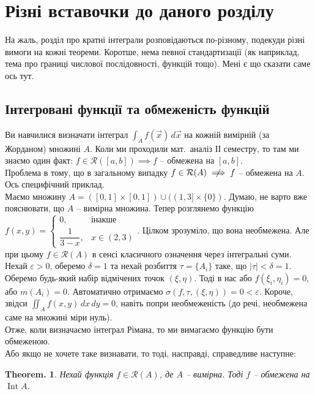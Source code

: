 \documentclass[a4paper, 10pt]{article}
\theoremstyle{theoremdd}
\theoremstyle{theoremdd}
\theoremstyle{theoremdd}
\theoremstyle{theoremdd}
\theoremstyle{theoremdd}
\theoremstyle{theoremdd}
\theoremstyle{theoremdd}
\theoremstyle{theoremdd}
\newtheorem*{theorem*}{Theorem.}
\theoremstyle{theoremdd}
\theoremstyle{theoremdd}
\theoremstyle{theoremdd}
\theoremstyle{theoremdd}
\theoremstyle{theoremdd}
\theoremstyle{theoremdd}
\theoremstyle{theoremdd}
\DeclareMathOperator{\Int}{Int}
\begin{document}
\section*{Різні вставочки до даного розділу}
На жаль, розділ про кратні інтеграли розповідаються по-різному, подекуди різні вимоги на кожні теореми. Коротше, нема певної стандартизації (як наприклад, тема про границі числової послідовності, функцій тощо). Мені є що сказати саме ось тут.

\subsection*{Інтегровані функції та обмеженість функцій}
Ви навчилися визначати інтеграл $\displaystyle\int_A f(\vec{x})\,d\vec{x}$ на кожній вимірній (за Жорданом) множині $A$. Коли ми проходили мат.\ аналіз ІІ семестру, то там ми знаємо один факт: $f \in \mathcal{R}([a,b]) \implies f$ -- обмежена на $[a,b]$.\\
Проблема в тому, що в загальному випадку $f \in \mathcal{R}(A) \centernot\implies f$ -- обмежена на $A$. Ось специфічний приклад.\\
Маємо множину $A = ([0,1] \times [0,1]) \cup ((1,3] \times \{0\})$. Думаю, не варто вже пояснювати, що $A$ -- вимірна множина. Тепер розглянемо функцію $f(x,y) = \begin{cases} 0, & \text{інакше} \\ \dfrac{1}{3-x}, & x \in (2,3) \end{cases}$. Цілком зрозуміло, що вона необмежена. Але при цьому $f \in \mathcal{R}(A)$ в сенсі класичного означення через інтегральні суми.\\
Нехай $\varepsilon > 0$, оберемо $\delta = 1$ та нехай розбиття $\tau = \{A_i\}$ таке, що $|\tau| < \delta = 1$. Оберемо будь-який набір відмічених точок $(\xi,\eta)$. Тоді в нас або $f(\xi_i,\eta_i) = 0$, або $m(A_i) = 0$. Автоматично отримаємо $\sigma(f,\tau,(\xi,\eta)) = 0 < \varepsilon$. Короче, звідси $\displaystyle\iint_A f(x,y)\,dx\,dy = 0$, навіть попри необмеженість (до речі, необмежена саме на множині міри нуль).
\bigskip \\
Отже, коли визначаємо інтеграл Рімана, то ми вимагаємо функцію бути обмеженою.\\
Або якщо не хочете таке визнавати, то тоді, насправді, справедливе наступне:
\begin{theorem*}
Нехай функція $f \in \mathcal{R}(A)$, де $A$ -- вимірна. Тоді $f$ -- обмежена на $\Int A$.
\end{theorem*}
\end{document}
